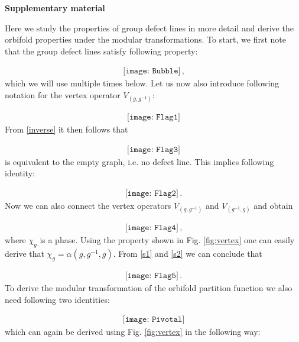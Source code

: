 \documentclass[aps,pra,twocolumn,superscriptaddress,10pt,article,nofootinbib,showpacs]{revtex4-1}
\begin{document}


\pagebreak
\appendix
\vspace{5 mm}
\begin{center}
\large{\textbf{Supplementary material}}
\end{center}

Here we study the properties of group defect lines in more detail and derive the orbifold properties under the modular transformations. To start, we first note that the group defect lines satisfy following property:

\begin{align}\label{inverse}
\texttt{[image: Bubble]}\, ,
\end{align}
which we will use multiple times below. Let us now also introduce following notation for the vertex operator $V_{(g,g^{-1})}$:

\begin{align}
\texttt{[image: Flag1]}
\end{align}
From \eqref{inverse} it then follows that 

\begin{align}
\texttt{[image: Flag3]}
\end{align}
is equivalent to the empty graph, i.e. no defect line. This implies following identity:

\begin{align}\label{s1}
\texttt{[image: Flag2]}\, .
\end{align}
Now we can also connect the vertex operators $V_{(g,g^{-1})}$ and $V_{(g^{-1},g)}$ and obtain

\begin{align}\label{s2}
\texttt{[image: Flag4]}\, ,
\end{align}
where $\chi_g$ is a phase. Using the property shown in Fig. \ref{fig:vertex} one can easily derive that $\chi_g = \alpha(g,g^{-1},g)$. From \eqref{s1} and \eqref{s2} we can conclude that

\begin{align}
\texttt{[image: Flag5]}\, .
\end{align}
To derive the modular transformation of the orbifold partition function we also need following two identities:

\begin{align}\label{s3}
\texttt{[image: Pivotal]}
\end{align}
which can again be derived using Fig. \ref{fig:vertex} in the following way:
\end{document}
